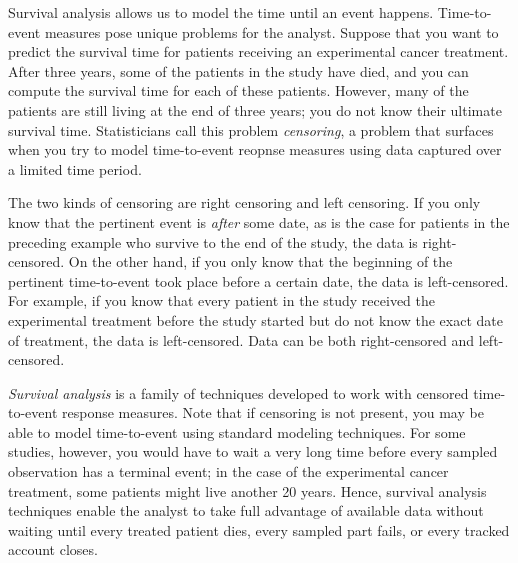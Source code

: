 \documentclass[a4paper,11pt]{article}
\begin{document}
Survival analysis allows us to model the time until an event happens. Time-to-event measures pose unique problems for the analyst. Suppose that you want to predict the survival time for patients receiving an experimental cancer treatment. After three years, some of the patients in the study have died, and you can compute the survival time for each of these patients. However, many of the patients are still living at the end of three years; you do not know their ultimate survival time. Statisticians call this problem \textit{censoring}, a problem that surfaces when you try to model time-to-event reopnse measures using data captured over a limited time period.

The two kinds of censoring are right censoring and left censoring. If you only know that the pertinent event is 
\textit{after} some date, as is the case for patients in the preceding example who survive to the end of the study, the data is right-censored. On the other hand, if you only know that the beginning of the pertinent time-to-event took place before a certain date, the data is left-censored. For example, if you know that every patient in the study received the experimental treatment before the study started but do not know the exact date of treatment, the data is left-censored. Data can be both right-censored and left-censored.


\textit{Survival analysis} is a family of techniques developed to work with censored time-to-event response measures. Note that if censoring is not present, you may be able to model time-to-event using standard modeling techniques. For some studies, however, you would have to wait a very long time before every sampled observation has a terminal event; in the case of the experimental cancer treatment, some patients might live another 20 years. Hence, survival analysis techniques enable the analyst to take full advantage of available data without waiting until every treated patient dies, every sampled part fails, or every tracked account closes.


\end{document}
